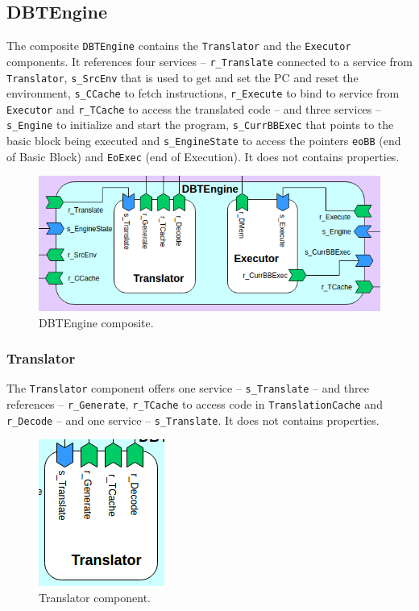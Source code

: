 \documentclass[11pt]{report}
\begin{document}
		\subsection{DBTEngine}
		
		\par The composite \texttt{DBTEngine} contains the \texttt{Translator} and the \texttt{Executor} components. It references four services -- \texttt{r\_Translate} connected to a service from \texttt{Translator}, \texttt{s\_SrcEnv} that is used to get and set the PC and reset the environment, \texttt{s\_CCache} to fetch instructions, \texttt{r\_Execute} to bind to service from \texttt{Executor} and \texttt{r\_TCache} to access the translated code -- and three services -- \texttt{s\_Engine} to initialize and start the program, \texttt{s\_CurrBBExec} that points to the basic block being executed and \texttt{s\_EngineState} to access the pointers \texttt{eoBB} (end of Basic Block) and \texttt{EoExec} (end of Execution). It does not contains properties.
		
		\begin{figure} [H]
			\centering
			\includegraphics[width=0.7\linewidth]{Images/arch-ref/DBTEngine}
			\caption{DBTEngine composite.}
			\label{fig:DBTEngine}
		\end{figure}
		
			\subsubsection{Translator}
			
			\par The \texttt{Translator} component offers one service -- \texttt{s\_Translate} -- and three references -- \texttt{r\_Generate}, \texttt{r\_TCache} to access code in \texttt{TranslationCache} and \texttt{r\_Decode} -- and one service -- \texttt{s\_Translate}. It does not contains properties. 
				
			\begin{figure} [H]
				\centering
				\includegraphics[width=0.3\linewidth]{Images/arch-ref/Translator}
				\caption{Translator component.}
				\label{fig:Translator}
			\end{figure}
			
\end{document}
